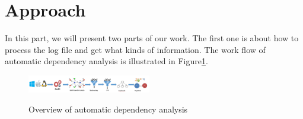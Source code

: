\section{Approach}
In this part, we will present two parts of our work. The first one is about how to process the log file and get what kinds of information. The work flow of automatic dependency analysis is illustrated in Figure\ref{fig:steps}.
\begin{figure}
	\centering
	\caption{Overview of automatic dependency analysis}
	\includegraphics[width=0.48\textwidth]{figFlow.png}
	\label{fig:steps}
\end{figure}
